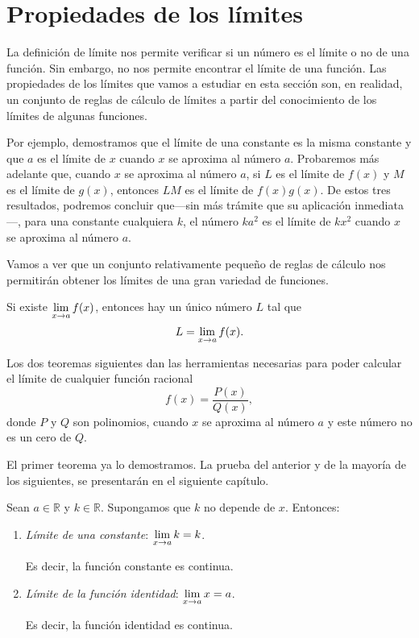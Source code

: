 \section{Propiedades de los límites}
La definición de límite nos permite verificar si un número es el límite o no de una función. Sin
embargo, no nos permite encontrar el límite de una función. Las propiedades de los límites que
vamos a estudiar en esta sección son, en realidad, un conjunto de reglas de cálculo de límites a
partir del conocimiento de los límites de algunas funciones.

Por ejemplo, demostramos que el límite de una constante es la misma constante y que $a$ es el
límite de $x$ cuando $x$ se aproxima al número $a$. Probaremos más adelante que, cuando $x$ se
aproxima al número $a$, si $L$ es el límite de $f(x)$ y $M$ es el límite de $g(x)$, entonces $LM$
es el límite de $f(x)g(x)$. De estos tres resultados, podremos concluir que---sin más trámite que
su aplicación inmediata---, para una constante cualquiera $k$, el número $ka^2$ es el límite de
$kx^2$ cuando $x$ se aproxima al número $a$.

Vamos a ver que un conjunto relativamente pequeño de reglas de cálculo nos permitirán obtener los
límites de una gran variedad de funciones.

\begin{teocal}\label{teol:Unicidad} Si existe $\displaystyle \limjc{f(x)}{x}{a}$, entonces hay un único número $L$ tal que
\[
L = \limjc{f(x)}{x}{a}.
\]
\end{teocal}

Los dos teoremas siguientes dan las herramientas necesarias para poder calcular el límite de
cualquier función racional
\[
f(x) = \frac{P(x)}{Q(x)},
\]
donde $P$ y $Q$ son polinomios, cuando $x$ se aproxima al número $a$ y este número no es un cero de
$Q$.

El primer teorema ya lo demostramos. La prueba del anterior y de la mayoría de los siguientes, se
presentarán en el siguiente capítulo.

\begin{teocal}\label{teol:ConstanteIdentidad} Sean $a\in\mathbb{R}$ y
$k\in\mathbb{R}$. Supongamos que $k$ no depende de $x$. Entonces:
\begin{enumerate}
\item \emph{Límite de una constante}: $\displaystyle{\limjc{k}{x}{a} = k}$.

   Es decir, la función constante es continua.

\item \emph{Límite de la función identidad}: $\displaystyle{\limjc{x}{x}{a} = a}$.

   Es decir, la función identidad es continua.
\end{enumerate}\end{teocal}

